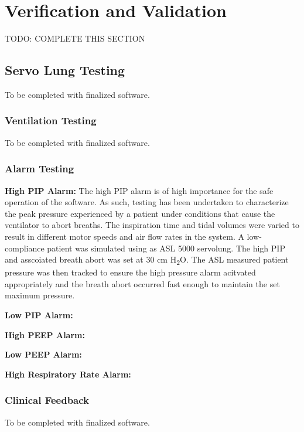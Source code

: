 \documentclass[]{article}
\begin{document}
\clearpage
\section{Verification and Validation}
\label{sect:vandv}

TODO: COMPLETE THIS SECTION

\subsection{Servo Lung Testing}

To be completed with finalized software.


\subsubsection{Ventilation Testing}

To be completed with finalized software.


\subsubsection{Alarm Testing}


\noindent \textbf{High PIP Alarm:} The high PIP alarm is of high importance for the safe operation of the software.  As such, testing has been undertaken to characterize the peak pressure experienced by a patient under conditions that cause the ventilator to abort breaths.  The inspiration time and tidal volumes were varied to result in different motor speeds and air flow rates in the system.  A low-compliance patient was simulated using as ASL 5000 servolung.  The high PIP and asscoiated breath abort was set at 30 cm H\textsubscript{2}O.  The ASL measured patient pressure was then tracked to ensure the high pressure alarm acitvated appropriately and the breath abort occurred fast enough to maintain the set maximum pressure.


\noindent \textbf{Low PIP Alarm:}



\noindent \textbf{High PEEP Alarm:}

\noindent \textbf{Low PEEP Alarm:}

\noindent \textbf{High Respiratory Rate Alarm:}

\subsubsection{Clinical Feedback}

To be completed with finalized software.
\end{document}

